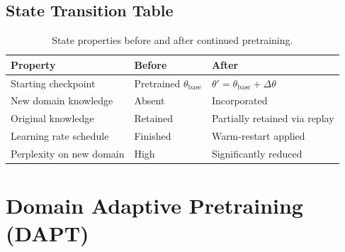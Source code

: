 \documentclass{article}
\begin{document}
\subsection{State Transition Table}
\begin{table}[h]\centering
\begin{tabular}{lll}\toprule
\textbf{Property} & \textbf{Before} & \textbf{After}\\\midrule
Starting checkpoint & Pretrained $\theta_{\text{base}}$ & $\theta' = \theta_{\text{base}} + \Delta\theta$\\
New domain knowledge & Absent & Incorporated\\
Original knowledge & Retained & Partially retained via replay\\
Learning rate schedule & Finished & Warm-restart applied\\
Perplexity on new domain & High & Significantly reduced\\\bottomrule
\end{tabular}
\caption{State properties before and after continued pretraining.}
\end{table}

\newpage
\section{Domain Adaptive Pretraining (DAPT)}
\end{document}
